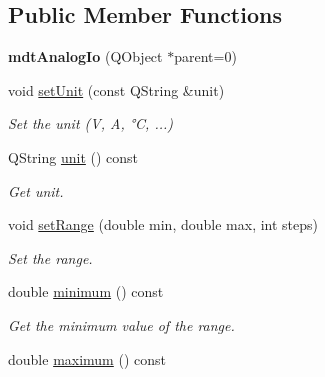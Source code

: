 \subsection*{Public Member Functions}
\begin{DoxyCompactItemize}
\item 
\hypertarget{classmdt_analog_io_affcdf039a10023b495cf49a5f476f829}{
{\bfseries mdtAnalogIo} (QObject $\ast$parent=0)}
\label{classmdt_analog_io_affcdf039a10023b495cf49a5f476f829}

\item 
\hypertarget{classmdt_analog_io_afb4cd82bee1ac1e77148c8621b1c66fa}{
void \hyperlink{classmdt_analog_io_afb4cd82bee1ac1e77148c8621b1c66fa}{setUnit} (const QString \&unit)}
\label{classmdt_analog_io_afb4cd82bee1ac1e77148c8621b1c66fa}

\begin{DoxyCompactList}\small\item\em Set the unit (V, A, °C, ...) \end{DoxyCompactList}\item 
\hypertarget{classmdt_analog_io_a126d5b9bf4a0bb9ce9f2ff6a010fef0e}{
QString \hyperlink{classmdt_analog_io_a126d5b9bf4a0bb9ce9f2ff6a010fef0e}{unit} () const }
\label{classmdt_analog_io_a126d5b9bf4a0bb9ce9f2ff6a010fef0e}

\begin{DoxyCompactList}\small\item\em Get unit. \end{DoxyCompactList}\item 
void \hyperlink{classmdt_analog_io_a8b32a0e21e18b9b27bb614a7bbdf409d}{setRange} (double min, double max, int steps)
\begin{DoxyCompactList}\small\item\em Set the range. \end{DoxyCompactList}\item 
\hypertarget{classmdt_analog_io_acd2b8cb33d5d42abf23672ad7675825e}{
double \hyperlink{classmdt_analog_io_acd2b8cb33d5d42abf23672ad7675825e}{minimum} () const }
\label{classmdt_analog_io_acd2b8cb33d5d42abf23672ad7675825e}

\begin{DoxyCompactList}\small\item\em Get the minimum value of the range. \end{DoxyCompactList}\item 
\hypertarget{classmdt_analog_io_a61e312bc7921a6ca097ea6babf3281a5}{
double \hyperlink{classmdt_analog_io_a61e312bc7921a6ca097ea6babf3281a5}{maximum} () const }
\label{classmdt_analog_io_a61e312bc7921a6ca097ea6babf3281a5}


\end{DoxyCompactItemize}
